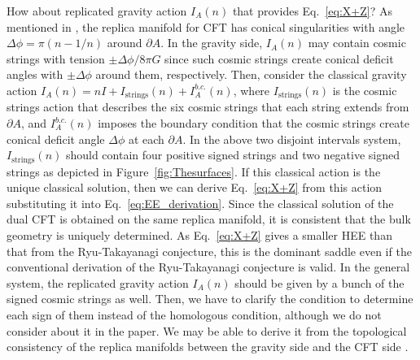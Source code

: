 \documentclass[%
 reprint,
 amsmath,amssymb,
 aps,
]{revtex4-2}
\begin{document}
    How about replicated gravity action $I_A(n)$ that provides Eq.~\eqref{eq:X+Z}? As mentioned in \cite{Dong:2016fnf}, the replica manifold for CFT has conical singularities with angle $\Delta \phi = \pi(n-1/n)$ around $\partial A$. In the gravity side, $I_A(n)$ may contain cosmic strings with tension $\pm \Delta \phi/8\pi G$ since such cosmic strings create conical deficit angles with $\pm \Delta \phi$ around them, respectively. Then, consider the classical gravity action $I_A(n) = nI + I_{\text{strings}}(n) + I_A^{b.c.}(n)$, where $I_{\text{strings}}(n)$ is the cosmic strings action that describes the six cosmic strings that each string extends from $\partial A$, and $I_A^{b.c.}(n)$ imposes the boundary condition that the cosmic strings create conical deficit angle $\Delta \phi$ at each $\partial A$. In the above two disjoint intervals system, $I_{\text{strings}}(n)$ should contain four positive signed strings and two negative signed strings as depicted in Figure~\ref{fig:Thesurfaces}. If this classical action is the unique classical solution, then we can derive Eq.~\eqref{eq:X+Z} from this action substituting it into Eq.~\eqref{eq:EE_derivation}. Since the classical solution of the dual CFT is obtained on the same replica manifold, it is consistent that the bulk geometry is uniquely determined. As Eq.~\eqref{eq:X+Z} gives a smaller HEE than that from the Ryu-Takayanagi conjecture, this is the dominant saddle even if the conventional derivation of the Ryu-Takayanagi conjecture is valid. In the general system, the replicated gravity action $I_A(n)$ should be given by a bunch of the signed cosmic strings as well. Then, we have to clarify the condition to determine each sign of them instead of the homologous condition, although we do not consider about it in the paper. We may be able to derive it from the topological consistency of the replica manifolds between the gravity side and the CFT side \cite{Haehl:2014zoa}.
    
\end{document}
